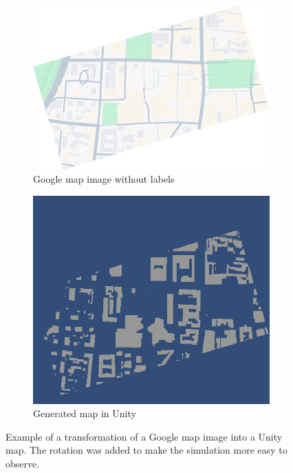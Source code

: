 \documentclass[9pt]{pnas-new}
\begin{document}
\begin{figure}[H]
\centering
\begin{subfigure}{.5\textwidth}
  \centering
  \includegraphics[width=0.95\columnwidth]{finalmap_rotated.png}
  \caption{Google map image without labels}
  \label{fig:sub1}
\end{subfigure}%
\begin{subfigure}{.5\textwidth}
  \centering
  \includegraphics[width=0.95\columnwidth]{fullmap.png}
  \caption{Generated map in Unity}
  \label{fig:sub2}
\end{subfigure}
\caption{Example of a transformation of a Google map image into a Unity map. The rotation was added to make the simulation more easy to observe. }
\label{fig2}
\end{figure}
\end{document}
